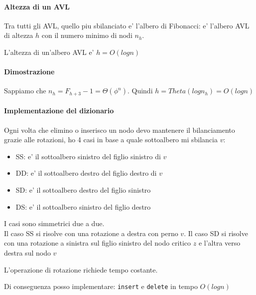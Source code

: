     \paragraph{Altezza di un AVL}
    Tra tutti gli AVL, quello piu sbilanciato e' l'albero di Fibonacci: e' l'albero AVL di altezza $h$ con
    il numero minimo di nodi $n_h$.

    \begin{definition}
        L'altezza di un'albero AVL e' $h=O(log n)$
    \end{definition}
    \paragraph{Dimostrazione}
        Sappiamo che $n_h = F_{h+3}-1= \Theta(\phi^n)$.
        Quindi $h = Theta(log n_h) = O(log n)$
    \paragraph{Implementazione del dizionario}
        Ogni volta che elimino o inserisco un nodo devo mantenere il bilanciamento grazie alle rotazioni, ho 4 casi in base a quale sottoalbero mi sbilancia $v$:
        \begin{itemize}
            \item SS: e' il sottoalbero sinistro del figlio sinistro di $v$
            \item DD: e' il sottoalbero destro del figlio destro di $v$
            \item SD: e' il sottoalbero destro del figlio sinistro
            \item DS: e' il sottoalbero sinistro del figlio destro
        \end{itemize}

        I casi sono simmetrici due a due. \\
        Il caso SS si risolve con una rotazione a destra con perno $v$.
        Il caso SD si risolve con una rotazione a sinistra sul figlio sinistro del nodo critico $z$ e l'altra verso destra sul nodo $v$

        L'operazione di rotazione richiede tempo costante.

        Di conseguenza posso implementare: \texttt{insert} e \texttt{delete} in tempo $O(logn)$